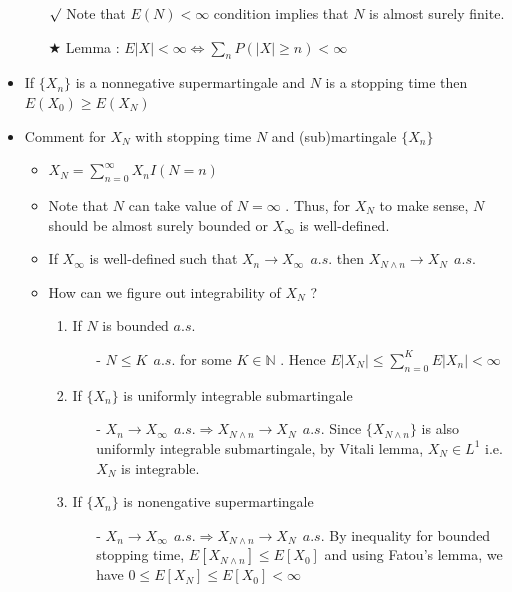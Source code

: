 \documentclass[12pt, A4]{article}
\newcommand{\rmk}{$\surd$}
\newcommand{\trick}{$\bigstar$}
\newcommand{\N}{\mathbb{N}}
\begin{document}
\begin{itemize}
	\begin{itemize}
		\item[\rmk] Note that $E(N)<\infty$ condition implies that $N$ is almost surely finite.
		\item[\trick] Lemma : $E|X|<\infty \Leftrightarrow \sum_n P(|X|\geq n)<\infty$ 
	\end{itemize}
	\item If $\{X_n\}$ is a nonnegative supermartingale and $N$ is a stopping time then $E(X_0)\geq E(X_N)$
	\item Comment for $X_N$ with stopping time $N$ and (sub)martingale $\{X_n\}$
	\begin{itemize}
		\item $X_N=\sum_{n=0}^\infty X_nI(N=n)$
		\item Note that $N$ can take value of $N=\infty$ . Thus, for $X_N$ to make sense, $N$ should be almost surely bounded or $X_\infty$ is well-defined. 
		\item If $X_\infty$ is well-defined such that $X_n\rightarrow X_\infty\;\,a.s.$ then $X_{N\wedge n}\rightarrow X_N\;\,a.s.$
		\item How can we figure out integrability of $X_N$ ?
		\begin{enumerate}
			\item If $N$ is bounded $a.s.$
			\begin{itemize}
				\item[-] $N\leq K\;\,a.s.$ for some $K\in \N$ . Hence $E|X_N|\leq \sum_{n=0}^K E|X_n|<\infty$
			\end{itemize}
			\item If $\{X_n\}$ is uniformly integrable submartingale
			\begin{itemize}
				\item[-] $X_n\rightarrow X_\infty\;\,a.s.\Rightarrow X_{N\wedge n}\rightarrow X_N\;\,a.s.$ \;Since $\{X_{N\wedge n}\}$ is also uniformly integrable submartingale, by Vitali lemma, $X_N\in L^1$ i.e. $X_N$ is integrable. 
			\end{itemize}
			\item If $\{X_n\}$ is nonengative supermartingale
			\begin{itemize}
				\item[-] $X_n\rightarrow X_\infty\;\,a.s.\Rightarrow X_{N\wedge n}\rightarrow X_N\;\,a.s.$ By inequality for bounded stopping time, $E[X_{N\wedge n}]\leq E[X_0]$ and using Fatou's lemma, we have $0\leq E[X_N]\leq E[X_0]<\infty$
			\end{itemize}
		\end{enumerate}

\end{itemize}
\end{itemize}
\end{document}
